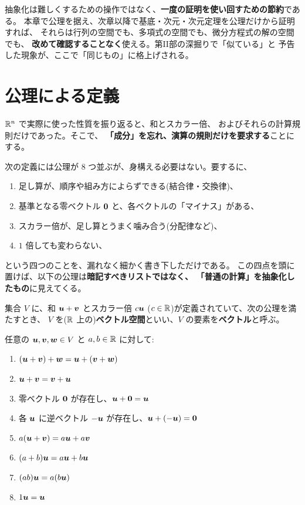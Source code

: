 抽象化は難しくするための操作ではなく、\textbf{一度の証明を使い回すための節約}である。
本章で公理を据え、次章以降で基底・次元・次元定理を公理だけから証明すれば、
それらは行列の空間でも、多項式の空間でも、微分方程式の解の空間でも、
\textbf{改めて確認することなく}使える。第II部の深掘りで「似ている」と
予告した現象が、ここで「同じもの」に格上げされる。

\section{公理による定義}

$\mathbb{R}^n$ で実際に使った性質を振り返ると、和とスカラー倍、
およびそれらの計算規則だけであった。そこで、
\textbf{「成分」を忘れ、演算の規則だけを要求する}ことにする。

次の定義には公理が $8$ つ並ぶが、身構える必要はない。要するに、
\begin{enumerate}
\item 足し算が、順序や組み方によらずできる(結合律・交換律)、
\item 基準となる零ベクトル $\bm{0}$ と、各ベクトルの「マイナス」がある、
\item スカラー倍が、足し算とうまく噛み合う(分配律など)、
\item $1$ 倍しても変わらない、
\end{enumerate}
という四つのことを、漏れなく細かく書き下しただけである。
この四点を頭に置けば、以下の公理は\textbf{暗記すべきリストではなく、
「普通の計算」を抽象化したもの}に見えてくる。

\begin{teigi}[ベクトル空間]
集合 $V$ に、和 $\bm{u} + \bm{v}$ とスカラー倍 $c\bm{u}$
($c \in \mathbb{R}$)が定義されていて、次の公理を満たすとき、
$V$ を($\mathbb{R}$ 上の)\textbf{ベクトル空間}といい、$V$ の要素を\textbf{ベクトル}と呼ぶ。

任意の $\bm{u}, \bm{v}, \bm{w} \in V$ と $a, b \in \mathbb{R}$ に対して:
\begin{enumerate}
\item $(\bm{u} + \bm{v}) + \bm{w} = \bm{u} + (\bm{v} + \bm{w})$
\item $\bm{u} + \bm{v} = \bm{v} + \bm{u}$
\item 零ベクトル $\bm{0}$ が存在し、$\bm{u} + \bm{0} = \bm{u}$
\item 各 $\bm{u}$ に逆ベクトル $-\bm{u}$ が存在し、$\bm{u} + (-\bm{u}) = \bm{0}$
\item $a(\bm{u} + \bm{v}) = a\bm{u} + a\bm{v}$
\item $(a + b)\bm{u} = a\bm{u} + b\bm{u}$
\item $(ab)\bm{u} = a(b\bm{u})$
\item $1\bm{u} = \bm{u}$
\end{enumerate}
\end{teigi}

